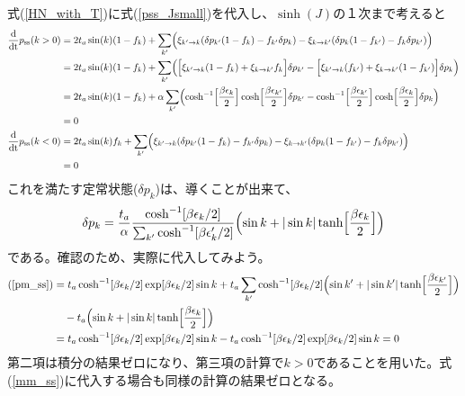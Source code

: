 \documentclass[dvipdfmx,autodetect-engine]{jsarticle}
\newcommand{\mr}[1]{\mathrm{#1}}
\newcommand{\dt}{\frac{\mr{d}}{\mr{dt}}}
\newcommand{\bv}[1]{\Bigl(#1\Bigr)}
\newcommand{\bg}[1]{\Bigl[#1\Bigr]}
\begin{document}
式(\ref{HN_with_T})に式(\ref{pss_Jsmall})を代入し、$\sinh(J)$の１次まで考えると
\begin{align}
  \dt p_{\mr{ss}}(k>0) &= 2t_a \sin(k) (1-f_k) +\sum_{k'}\bv{\xi_{k'\rightarrow k} (\delta p_{k'}(1-f_k) - f_{k'}\delta p_k )- \xi_{k\rightarrow k'} (\delta p_{k}(1-f_{k'}) - f_k\delta p_{k'})}\nonumber\\
  &= 2t_a \sin(k) (1-f_k) +\sum_{k'}\bv{\bg{\xi_{k'\rightarrow k}(1-f_k)+\xi_{k\rightarrow k'}f_k}\delta p_{k'} - \bg{\xi_{k'\rightarrow k}(f_{k'})+\xi_{k\rightarrow k'}(1- f_{k'})}\delta p_{k}}\nonumber\\
  &= 2t_a \sin(k) (1-f_k) +\alpha\sum_{k'}\bv{\cosh^{-1}\bg{\frac{\beta\epsilon_k}{2}}\cosh\bg{\frac{\beta\epsilon_{k'}}{2}}\delta p_{k'} - \cosh^{-1}\bg{\frac{\beta\epsilon_{k'}}{2}}\cosh\bg{\frac{\beta\epsilon_{k}}{2}}\delta p_{k}}\nonumber\\
  &= 0\label{pm_ss}\\
  \dt p_{\mr{ss}}(k<0) &= 2t_a \sin(k) f_k +\sum_{k'}\bv{\xi_{k'\rightarrow k} (\delta p_{k'}(1-f_k) - f_{k'}\delta p_k )- \xi_{k\rightarrow k'} (\delta p_{k}(1-f_{k'}) - f_k\delta p_{k'})}\nonumber\\
  &= 0\label{mm_ss}
\end{align}
これを満たす定常状態($\delta p_k$)は、導くことが出来て、
\begin{align}
    \delta p_k = \frac{t_a}{\alpha}\frac{\cosh^{-1}[\beta\epsilon_k/2]}{\sum_{k'}\cosh^{-1}[\beta\epsilon_k'/2]} \bv{\sin k + |\sin k|\tanh\bg{\frac{\beta\epsilon_k}{2}}}
\end{align}
である。確認のため、実際に代入してみよう。
\begin{align}
    (\ref{pm_ss}) &= t_a \cosh^{-1}[\beta\epsilon_k/2]\exp[\beta\epsilon_k/2]\sin k + t_a\sum_{k'}\cosh^{-1}[\beta\epsilon_k/2]\bv{\sin k' + |\sin k'|\tanh\bg{\frac{\beta\epsilon_{k'}}{2}}}\nonumber\\
    & \ \ \ - t_a\bv{\sin k + |\sin k|\tanh\bg{\frac{\beta\epsilon_{k}}{2}}}\\
    &= t_a \cosh^{-1}[\beta\epsilon_k/2]\exp[\beta\epsilon_k/2]\sin k - t_a \cosh^{-1}[\beta\epsilon_k/2]\exp[\beta\epsilon_k/2]\sin k = 0
\end{align}
第二項は積分の結果ゼロになり、第三項の計算で$k>0$であることを用いた。式(\ref{mm_ss})に代入する場合も同様の計算の結果ゼロとなる。
\end{document}
